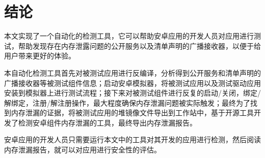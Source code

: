 \chapter{结论}\label{chapter_conclusion}
本文实现了一个自动化的检测工具，它可以帮助安卓应用的开发人员对应用进行测试，帮助发现存在内存泄露问题的公开服务以及清单声明的广播接收器，以便于给用户带来更好的体验。

本自动化检测工具首先对被测试应用进行反编译，分析得到公开服务和清单声明的广播接收器等被测试组件信息；启动安卓模拟器，将被测试应用以及测试驱动应用安装到模拟器上进行测试流程；接下来对被测试组件进行反复的启动/关闭，绑定/解绑定，注册/解注册操作，最大程度确保内存泄漏问题被实际触发；最终为了找到内存泄漏的证据，将被测试应用的堆镜像文件导出到工作站中，基于开源工具开发了检测安卓组件内存泄漏的工具，最终导出内存泄漏报告。

安卓应用的开发人员只需要运行本文中的工具对其开发的应用进行检测，然后阅读内存泄漏报告，就可以对应用进行安全性的评估。